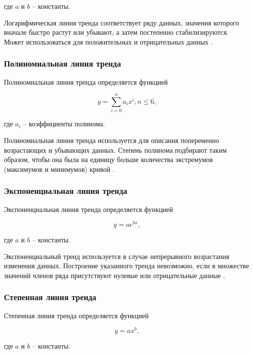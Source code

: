 \documentclass[a4paper,14pt]{extreport}
\begin{document}
где $a$ и $b$ -- константы.

Логарифмическая линия тренда соответствует ряду данных, значения которого вначале быстро растут или убывают, а затем постепенно стабилизируются. Может использоваться для положительных и отрицательных данных \cite{lt_exel}.

\subsubsection*{Полиномиальная линия тренда}

Полиномиальная линия тренда определяется функцией

\begin{equation}
	y = \sum_{i = 0}^{n} a_i x^i, n \leqslant 6,
\end{equation}

где $a_i$ -- коэффициенты полинома.

Полиномиальная линия тренда используется для описания попеременно возрастающих и убывающих данных. Степень полинома подбирают таким образом, чтобы она была на единицу больше количества экстремумов (максимумов и минимумов) кривой \cite{lt_exel}.

\subsubsection*{Экспоненциальная линия тренда}

Экспоненциальная линия тренда определяется функцией

\begin{equation}
	y = a e ^ {bx},
\end{equation}

где $a$ и $b$ -- константы.

Экспоненциальный тренд используется в случае непрерывного возрастания изменения данных. Построение указанного тренда не­возможно, если в множестве значений членов ряда присутствуют нулевые или отрицательные данные \cite{lt_exel}.

\subsubsection*{Степенная линия тренда}

Степенная линия тренда определяется функцией

\begin{equation}
	y = a x ^ b,
\end{equation}

где $a$ и $b$ -- константы.
\end{document}
